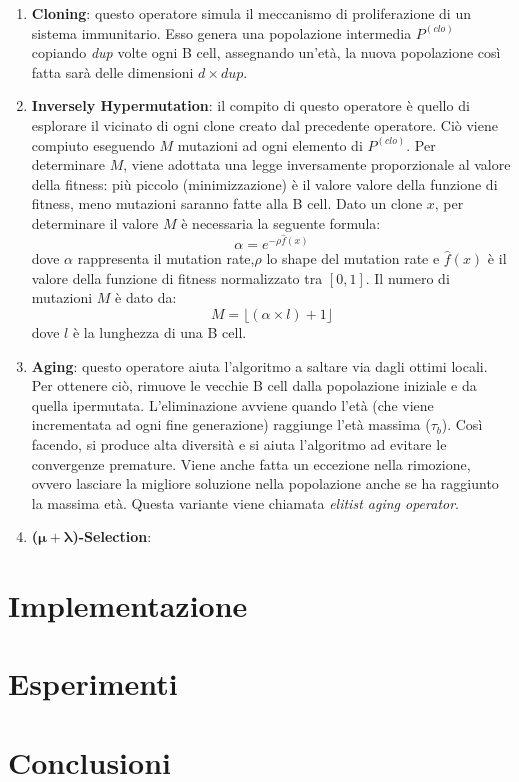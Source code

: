 \documentclass[a4paper,12pt,titlepage,oneside]{article}
\begin{document}
\begin{enumerate}
\item \textbf{Cloning}: questo operatore simula il meccanismo di proliferazione di un sistema immunitario. Esso genera una popolazione intermedia $P^{(clo)}$ copiando \textit{dup} volte ogni B cell, assegnando un'età, la nuova popolazione così fatta sarà delle dimensioni \textit{$d \times dup$}. 
\item \textbf{Inversely Hypermutation}: il compito di questo operatore è quello di esplorare il vicinato di ogni clone creato dal precedente operatore. Ciò viene compiuto eseguendo $M$ mutazioni ad ogni elemento di $P^{(clo)}$. Per determinare $M$, viene adottata una legge inversamente proporzionale al valore della fitness: più piccolo (minimizzazione) è il valore valore della funzione di fitness, meno mutazioni saranno fatte alla B cell. Dato un clone $x$, per determinare il valore $M$ è necessaria la seguente formula:
\begin{equation}
\alpha=e^{-\rho\hat{f}(x)}
\end{equation}
dove $\alpha$ rappresenta il mutation rate,$\rho$ lo shape del mutation rate e $\hat{f}(x)$ è il valore della funzione di fitness normalizzato tra $[0,1]$. Il numero di mutazioni $M$ è dato da:
\begin{equation}
M = \lfloor(\alpha \times l) + 1 \rfloor
\end{equation}
dove $l$ è la lunghezza di una B cell. 
\item \textbf{Aging}: questo operatore aiuta l'algoritmo a saltare via dagli ottimi locali. Per ottenere ciò, rimuove le vecchie B cell dalla popolazione iniziale e da quella ipermutata. L'eliminazione avviene quando l'età (che viene incrementata ad ogni fine generazione) raggiunge l'età massima ($\tau_{b}$). Così facendo, si produce alta diversità e si aiuta l'algoritmo ad evitare le convergenze premature. Viene anche fatta un eccezione nella rimozione, ovvero lasciare la migliore soluzione nella popolazione anche se ha raggiunto la massima età. Questa variante viene chiamata \textit{elitist aging operator}.
\item \textbf{($\mathbf{\mu + \lambda}$)-Selection}:
\end{enumerate}
\section{Implementazione}

\section{Esperimenti}
\section{Conclusioni}
\newpage
{}

\end{document}
